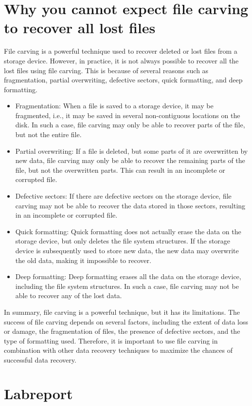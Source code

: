 \documentclass{scrreprt}
\begin{document}
\section{Why you cannot expect file carving to recover all lost files}
File carving is a powerful technique used to recover deleted or lost files from a storage device. However, in practice, it is not always possible to recover all the lost files using file carving. This is because of several reasons such as fragmentation, partial overwriting, defective sectors, quick formatting, and deep formatting.
\begin{itemize}
\item Fragmentation: When a file is saved to a storage device, it may be fragmented, i.e., it may be saved in several non-contiguous locations on the disk. In such a case, file carving may only be able to recover parts of the file, but not the entire file.
\item Partial overwriting: If a file is deleted, but some parts of it are overwritten by new data, file carving may only be able to recover the remaining parts of the file, but not the overwritten parts. This can result in an incomplete or corrupted file.
\item Defective sectors: If there are defective sectors on the storage device, file carving may not be able to recover the data stored in those sectors, resulting in an incomplete or corrupted file.
\item Quick formatting: Quick formatting does not actually erase the data on the storage device, but only deletes the file system structures. If the storage device is subsequently used to store new data, the new data may overwrite the old data, making it impossible to recover.
\item Deep formatting: Deep formatting erases all the data on the storage device, including the file system structures. In such a case, file carving may not be able to recover any of the lost data.
\end{itemize}
In summary, file carving is a powerful technique, but it has its limitations. The success of file carving depends on several factors, including the extent of data loss or damage, the fragmentation of files, the presence of defective sectors, and the type of formatting used. Therefore, it is important to use file carving in combination with other data recovery techniques to maximize the chances of successful data recovery.

\section{Labreport}
\end{document}
